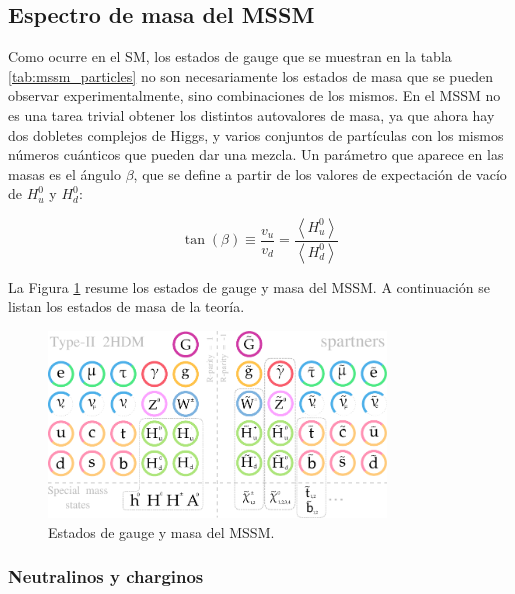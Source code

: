 \subsection{Espectro de masa del MSSM}

Como ocurre en el SM, los estados de gauge que se muestran en la tabla \ref{tab:mssm_particles} no son necesariamente los estados de masa que se pueden observar experimentalmente, sino combinaciones de los mismos. En el MSSM no es una tarea trivial obtener los distintos autovalores de masa, ya que ahora hay dos dobletes complejos de Higgs, y varios conjuntos de partículas con los mismos números cuánticos que pueden dar una mezcla. Un parámetro que aparece en las masas es el ángulo $\beta$, que se define a partir de los valores de expectación de vacío de $H_u^0$ y $H_d^0$:
	
\begin{equation}
	\tan(\beta) \equiv \frac{v_u}{v_d} = \frac{\left< H_u^0 \right>}{\left< H_d^0 \right>}
\end{equation}

La Figura \ref{fig:susy_part} resume los estados de gauge y masa del MSSM. A continuación se listan los estados de masa de la teoría.

\begin{figure}
  \centering
  \includegraphics[width=0.8\textwidth]{images/sm_susy.pdf}
  \caption{Estados de gauge y masa del MSSM. }
  \label{fig:susy_part}
\end{figure}

\subsubsection{Neutralinos y charginos}

